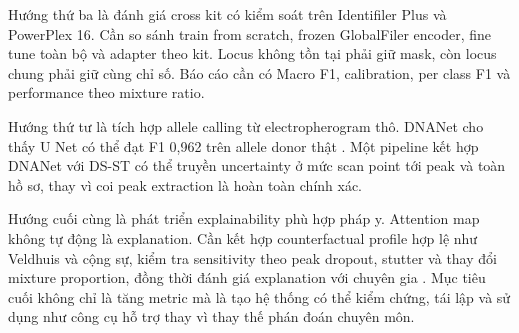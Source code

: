 \documentclass[12pt,a4paper]{article}
\begin{document}
Hướng thứ ba là đánh giá cross kit có kiểm soát trên Identifiler Plus và PowerPlex 16. Cần so sánh train from scratch, frozen GlobalFiler encoder, fine tune toàn bộ và adapter theo kit. Locus không tồn tại phải giữ mask, còn locus chung phải giữ cùng chỉ số. Báo cáo cần có Macro F1, calibration, per class F1 và performance theo mixture ratio.

Hướng thứ tư là tích hợp allele calling từ electropherogram thô. DNANet cho thấy U Net có thể đạt F1 0,962 trên allele donor thật \cite{dewit2025}. Một pipeline kết hợp DNANet với DS-ST có thể truyền uncertainty ở mức scan point tới peak và toàn hồ sơ, thay vì coi peak extraction là hoàn toàn chính xác.

Hướng cuối cùng là phát triển explainability phù hợp pháp y. Attention map không tự động là explanation. Cần kết hợp counterfactual profile hợp lệ như Veldhuis và cộng sự, kiểm tra sensitivity theo peak dropout, stutter và thay đổi mixture proportion, đồng thời đánh giá explanation với chuyên gia \cite{veldhuis2022}. Mục tiêu cuối không chỉ là tăng metric mà là tạo hệ thống có thể kiểm chứng, tái lập và sử dụng như công cụ hỗ trợ thay vì thay thế phán đoán chuyên môn.
\end{document}
